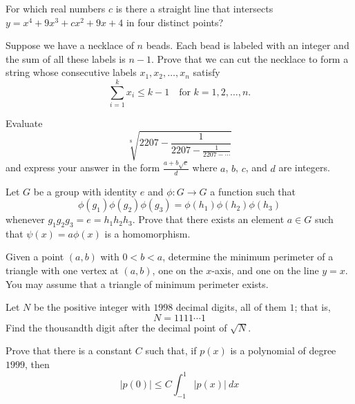 \documentclass[12pt]{article}
\begin{document}
    \begin{exercise}[1994 B2]
        For which real numbers $c$ is there a straight line that intersects $y=x^4+9x^3+cx^2+9x+4$ in four distinct points?
    \end{exercise}

    \begin{exercise}[1995 A4]
        Suppose we have a necklace of $n$ beads. Each bead is labeled with an integer and the sum of all these labels is $n - 1$. Prove that we can cut the necklace to form a string whose consecutive labels $x_1,x_2, \ldots, x_n$ satisfy
        \[\sum_{i = 1}^{k} x_{i} \leq k - 1 \quad \text{for $k = 1, 2, \ldots, n$}.\]
    \end{exercise}

    \begin{exercise}[1995 B4]
        Evaluate
        \[\sqrt[8]{2207 - \frac{1}{2207-\frac{1}{2207-\cdots}}}\] and express your answer in the form $\frac{a+b\sqrt{c}}{d}$ where $a$, $b$, $c$, and $d$ are integers.
    \end{exercise}

    \begin{exercise}[1997 A4]
        Let $G$ be a group with identity $e$ and $\phi: G \rightarrow G$ a function such that 
        \[\phi(g_{1})\phi(g_{2})\phi(g_{3}) = \phi(h_{1})\phi(h_{2})\phi(h_{3})
        \]
        whenever $g_{1}g_{2}g_{3} = e = h_{1}h_{2}h_{3}$. Prove that there exists an element $a \in G$ such that $\psi(x) = a\phi(x)$ is a homomorphism. 
    \end{exercise}

    \begin{exercise}[1998 B2]
        Given a point $(a, b)$ with $0 < b < a$, determine the minimum perimeter of a triangle with one vertex at $(a, b)$, one on the $x$-axis, and one on the line $y = x$. You may assume that a triangle of minimum perimeter exists.
    \end{exercise}

    \begin{exercise}[1998 B5]
        Let $N$ be the positive integer with $1998$ decimal digits, all of them $1$; that is, \[N=1111\cdots 1\] Find the thousandth digit after the decimal point of $\sqrt{N}$.
    \end{exercise}

    \begin{exercise}[1999 A5]
        Prove that there is a constant $C$ such that, if $p(x)$ is a polynomial of degree $1999$, then
        \[|p(0)|\leqslant C\int_{-1}^1 |p(x)|\ dx\]
    \end{exercise}
\end{document}
